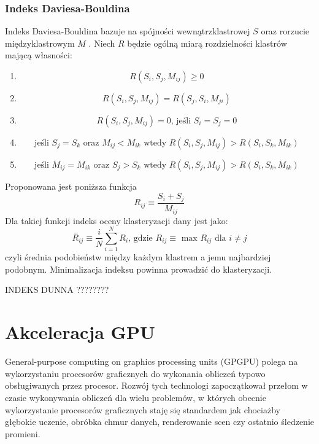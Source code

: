 \subsubsection{Indeks Daviesa-Bouldina}
Indeks Daviesa-Bouldina bazuje na spójności wewnątrzklastrowej $S$ oraz rorzucie międzyklastrowym $M$ \cite{DB79}. Niech $R$ będzie ogólną miarą rozdzielności klastrów mającą własności:
\begin{enumerate}
\item \begin{equation}
R(S_i,S_j,M_{ij}) \geq 0
\end{equation}
\item \begin{equation}
R(S_i,S_j,M_{ij}) = R(S_j,S_i,M_{ji})
\end{equation}
\item \begin{equation}
R(S_i,S_j,M_{ij}) = 0\text{, jeśli } S_i=S_j=0
\end{equation}
\item \begin{equation}
\text{jeśli } S_j=S_k \text{ oraz } M_{ij} < M_{ik} \text{ wtedy } R(S_i,S_j,M_{ij}) > R(S_i,S_k,M_{ik})
\end{equation}
\item \begin{equation}
\text{jeśli } M_{ij} = M_{ik} \text{ oraz } S_j > S_k \text{ wtedy } R(S_i,S_j,M_{ij}) > R(S_i,S_k,M_{ik})
\end{equation}
\end{enumerate}
Proponowana jest poniższa funkcja \cite{DB79}
\begin{equation}
R_{ij} \equiv \frac{S_i + S_j}{M_{ij}}
\end{equation}
Dla takiej funkcji indeks oceny klasteryzacji dany jest jako:
\begin{equation}
\bar{R}_{ij} \equiv \frac{i}{N} \displaystyle \sum_{i=1}^{N} R_i \text{, gdzie } R_{ij} \equiv \text{ max } R_{ij} \text{ dla } i \neq j
\end{equation}
czyli średnia podobieństw między każdym klastrem a jemu najbardziej podobnym. Minimalizacja indeksu powinna prowadzić do  klasteryzacji.

INDEKS DUNNA ????????


\section{Akceleracja GPU}
\label{sec:akceleracja}
General-purpose computing on graphics processing units (GPGPU) polega na wykorzystaniu procesorów graficznych do wykonania obliczeń typowo obsługiwanych przez procesor. Rozwój tych technologi zapoczątkował przełom w czasie wykonywania obliczeń dla wielu problemów, w których obecnie wykorzystanie procesorów graficznych staję się standardem jak chociażby głębokie uczenie, obróbka chmur danych, renderowanie scen czy ostatnio śledzenie promieni.

